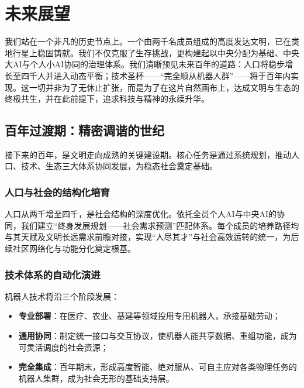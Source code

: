 \chapter{未来展望}\label{ux7b2cux5341ux56dbux7ae0ux672aux6765ux5c55ux671b}

我们站在一个非凡的历史节点上。一个由两千名成员组成的高度发达文明，已在类地行星上稳固铸就。我们不仅克服了生存挑战，更构建起以中央分配为基础、中央大AI与个人小AI协同的治理体系。我们清晰预见未来百年的道路：人口将稳步增长至四千人并进入动态平衡；技术圣杯------``完全顺从机器人群''------将于百年内实现。这一切并非为了无休止扩张，而是为了在这片自然画布上，达成文明与生态的终极共生，并在此前提下，追求科技与精神的永续升华。

\section{百年过渡期：精密调谐的世纪}\label{ux767eux5e74ux8fc7ux6e21ux671fux7cbeux5bc6ux8c03ux8c10ux7684ux4e16ux7eaa}

接下来的百年，是文明走向成熟的关键建设期。核心任务是通过系统规划，推动人口、技术、生态三大体系协同发展，为稳态社会奠定基础。

\subsection{人口与社会的结构化培育}\label{ux4ebaux53e3ux4e0eux793eux4f1aux7684ux7ed3ux6784ux5316ux57f9ux80b2}

人口从两千增至四千，是社会结构的深度优化。依托全员个人AI与中央AI的协同，我们建立``终身发展规划------社会需求预测''匹配体系。每个成员的培养路径均与其天赋及文明长远需求前瞻对接，实现``人尽其才''与社会高效运转的统一，为后续社区网络化与功能分化奠定根基。

\subsection{技术体系的自动化演进}\label{ux6280ux672fux4f53ux7cfbux7684ux81eaux52a8ux5316ux6f14ux8fdb}

机器人技术将沿三个阶段发展：

\begin{itemize}
\item
  \textbf{专业部署}：在医疗、农业、基建等领域投用专用机器人，承接基础劳动；
\item
  \textbf{通用协同}：制定统一接口与交互协议，使机器人能共享数据、重组功能，成为可灵活调度的社会资源；
\item
  \textbf{完全集成}：百年期末，形成高度智能、绝对服从、可自主应对各类物理任务的机器人集群，成为社会无形的基础支持层。
\end{itemize}


